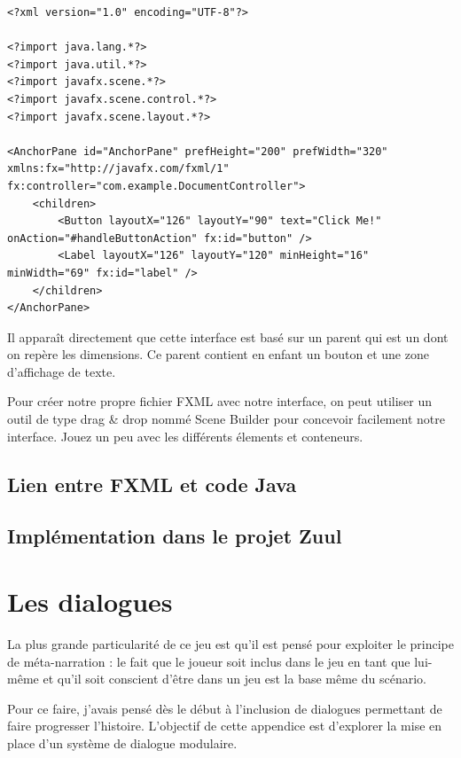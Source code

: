 \begin{appendix}
\begin{codeblock}
\begin{verbatim}
<?xml version="1.0" encoding="UTF-8"?>

<?import java.lang.*?>
<?import java.util.*?>
<?import javafx.scene.*?>
<?import javafx.scene.control.*?>
<?import javafx.scene.layout.*?>

<AnchorPane id="AnchorPane" prefHeight="200" prefWidth="320" xmlns:fx="http://javafx.com/fxml/1" fx:controller="com.example.DocumentController">
    <children>
        <Button layoutX="126" layoutY="90" text="Click Me!" onAction="#handleButtonAction" fx:id="button" />
        <Label layoutX="126" layoutY="120" minHeight="16" minWidth="69" fx:id="label" />
    </children>
</AnchorPane>
\end{verbatim}
\end{codeblock}

Il apparaît directement que cette interface est basé sur un parent qui est un  dont on repère les dimensions. Ce parent contient en enfant un bouton et une zone d'affichage de texte.

Pour créer notre propre fichier FXML avec notre interface, on peut utiliser un outil de type drag \& drop nommé Scene Builder pour concevoir facilement notre interface. Jouez un peu avec les différents élements et conteneurs.

\section{Lien entre FXML et code Java}

\section{Implémentation dans le projet Zuul}



\chapter{Les dialogues}

La plus grande particularité de ce jeu est qu'il est pensé pour exploiter le principe de méta-narration : le fait que le joueur soit inclus dans le jeu en tant que lui-même et qu'il soit conscient d'être dans un jeu est la base même du scénario.

Pour ce faire, j'avais pensé dès le début à l'inclusion de dialogues permettant de faire progresser l'histoire. L'objectif de cette appendice est d'explorer la mise en place d'un système de dialogue modulaire.

\end{appendix}
